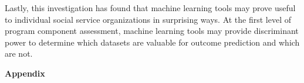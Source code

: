 \documentclass[twoside]{article}	%
\begin{document}
\noindent Lastly, this investigation has found that machine learning tools may prove useful to individual social service organizations in surprising ways. At the first level of program component assessment, machine learning tools may provide discriminant power to determine which datasets are valuable for outcome prediction and which are not. 
 


\newpage




\newpage
\vspace*{5cm}
\begin{center}
\LARGE \textbf{Appendix}
\end{center}






\end{document}
